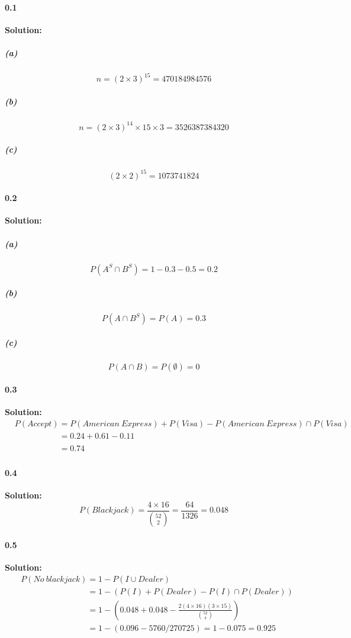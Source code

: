 \documentclass{article}[11pt]
\begin{document}
	\paragraph{0.1}\textbf{Solution:}
		\subparagraph{(a)} \[n = (2 \times 3)^{15} = 470184984576\]
		\subparagraph{(b)} \[n = (2 \times 3)^{14} \times 15 \times 3 = 3526387384320\]
		\subparagraph{(c)} \[(2 \times 2)^{15} = 1073741824\]
	\paragraph{0.2}\textbf{Solution:}
		\subparagraph{(a)} \[P(A^S \cap B^S) = 1 - 0.3 -0.5 = 0.2\]
		\subparagraph{(b)} \[P(A \cap B^S) = P(A) = 0.3\]
		\subparagraph{(c)} \[P(A \cap B) = P(\emptyset) = 0\]
	\paragraph{0.3}\textbf{Solution:} 
	\begin{align}
		&P(Accept) = P(American\ Express) + P(Visa) - P(American\ Express) \cap P(Visa)\nonumber\\
		&\phantom{P(Accept)} = 0.24 + 0.61 - 0.11\nonumber\\
		&\phantom{P(Accept)} = 0.74\nonumber
	\end{align}
	\paragraph{0.4}\textbf{Solution:} \[P(Blackjack) = \frac{4 \times 16}{\binom{52}{2}} = \frac{64}{1326} = 0.048\]
	\paragraph{0.5}\textbf{Solution:} 
	\begin{align}
		&P(No\ blackjack) = 1 - P(I \cup Dealer)\nonumber\\
		&\phantom{P(No\ blackjack)} = 1 - (P(I) + P(Dealer) - P(I) \cap P(Dealer))\nonumber\\
		&\phantom{P(No\ blackjack)} = 1 - (0.048 + 0.048 - \frac{2(4 \times 16)(3 \times 15)}{\binom{52}{4}})\nonumber\\
		&\phantom{P(No\ blackjack)} = 1 - (0.096 - 5760/270725) = 1 - 0.075 = 0.925\nonumber
	\end{align}
\end{document}

